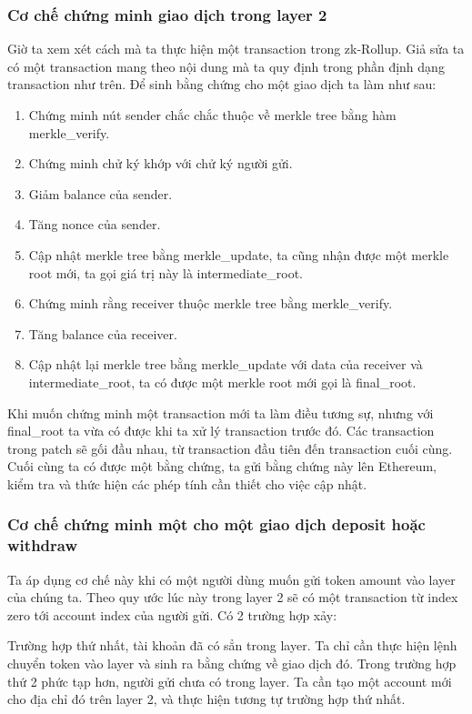 \documentclass[../thesis.tex]{subfiles}
\begin{document}
\subsubsection{Cơ chế chứng minh giao dịch trong layer 2} 
Giờ ta xem xét cách mà ta thực hiện một transaction trong zk-Rollup. 
Giả sửa ta có một transaction mang theo nội dung mà ta quy định trong phần định dạng transaction như trên. Để sinh bằng chứng cho một giao dịch ta làm như sau:

\begin{enumerate}
\item Chứng minh nút sender chắc chắc thuộc về merkle tree bằng hàm merkle\_verify. 
\item Chứng minh chử ký khớp với chử ký người gửi. 
\item Giảm balance của sender.
\item Tăng nonce của sender.
\item Cập nhật merkle tree bằng merkle\_update, ta cũng nhận được một merkle root mới, ta gọi giá trị này là intermediate\_root. 
\item Chứng minh rằng receiver thuộc merkle tree bằng merkle\_verify.
\item Tăng balance của receiver.
\item Cập nhật lại merkle tree bằng merkle\_update với data của receiver và intermediate\_root, ta có được một merkle root mới gọi là final\_root.
\end{enumerate}

Khi muốn chứng minh một transaction mới ta làm điều tương sự, nhưng với final\_root ta vừa có được khi ta xử lý transaction trước đó. Các transaction trong patch sẽ gối đầu nhau, từ transaction đầu tiên đến transaction cuối cùng. Cuối cùng ta có được một bằng chứng, ta gửi bằng chứng này lên Ethereum, kiểm tra và thức hiện các phép tính cần thiết cho việc cập nhật.

\subsubsection{Cơ chế chứng minh một cho một giao dịch deposit hoặc withdraw}
Ta áp dụng cơ chế này khi có một người dùng muốn gửi token amount vào layer của chúng ta. Theo quy ước lúc này trong layer 2 sẽ có một transaction từ index zero tới account index của người gửi. Có 2 trường hợp xảy:

Trường hợp thứ nhất, tài khoản đã có sẳn trong layer. Ta chỉ cần thực hiện lệnh chuyển token vào layer và sinh ra bằng chứng về giao dịch đó. Trong trường hợp thứ 2 phức tạp hơn, người gửi chưa có trong layer. Ta cần tạo một account mới cho địa chỉ đó trên layer 2, và thực hiện tương tự trường hợp thứ nhất.
\end{document}
